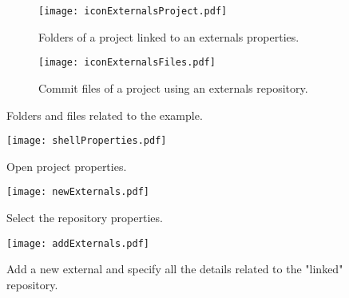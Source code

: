 \begin{figure}[htbp]
\begin{subfigure}{0.45\textwidth}
  \centering
  \texttt{[image: iconExternalsProject.pdf]}
  \caption{Folders of a project linked to an externals properties.}
  \label{fig:iconExternalsProject}
\end{subfigure}%
\hspace{5mm}
\begin{subfigure}{0.45\textwidth}
  \centering
  \texttt{[image: iconExternalsFiles.pdf]}
  \caption{Commit files of a project using an externals repository.}
  \label{fig:iconExternalsFiles}
\end{subfigure}
\caption{Folders and files related to the example.}
\label{fig:svnExternalsIcons}
\end{figure}
 


\begin{figure}[htbp]
    \centering
    \texttt{[image: shellProperties.pdf]}
    \caption{Open project properties.}
    \label{fig:shellProperties}
\end{figure}


\begin{figure}[htbp]
    \centering
    \texttt{[image: newExternals.pdf]}
    \caption{Select the repository properties.}
    \label{fig:newExternals}
\end{figure}


\begin{figure}[htbp]
    \centering
    \texttt{[image: addExternals.pdf]}
    \caption{Add a new external and specify all the details related to the "linked" repository.}
    \label{fig:addExternals}
\end{figure}

